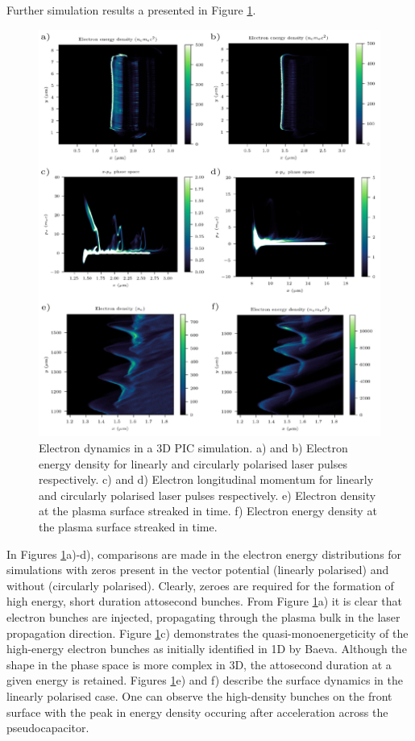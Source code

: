 Further simulation results a presented in Figure \ref{fig:zvp3ddynamics}.
\begin{figure}
	\centering
	\includegraphics[width=1\linewidth]{figures/zvp/zvp_3D_dynamics}
	\caption[Electron dynamics in 3D PIC simulation for both linear and circularly polarised relativistic laser pulses.]{Electron dynamics in a 3D PIC simulation. a) and b) Electron energy density for linearly and circularly polarised laser pulses respectively. c) and d) Electron longitudinal momentum for linearly and circularly polarised laser pulses respectively.  e) Electron density at the plasma surface streaked in time. f) Electron energy density at the plasma surface streaked in time.}
	\label{fig:zvp3ddynamics}
\end{figure}
In Figures \ref{fig:zvp3ddynamics}a)-d), comparisons are made in the electron energy distributions for simulations with zeros present in the vector potential (linearly polarised) and without (circularly polarised). Clearly, zeroes are required for the formation of high energy, short duration attosecond bunches. From Figure \ref{fig:zvp3ddynamics}a) it is clear that electron bunches are injected, propagating through the plasma bulk in the laser propagation direction. Figure \ref{fig:zvp3ddynamics}c) demonstrates the quasi-monoenergeticity of the high-energy electron bunches as initially identified in 1D by Baeva. Although the shape in the phase space is more complex in 3D, the attosecond duration at a given energy is retained. Figures \ref{fig:zvp3ddynamics}e) and f) describe the surface dynamics in the linearly polarised case. One can observe the high-density bunches on the front surface with the peak in energy density occuring after acceleration across the pseudocapacitor.

